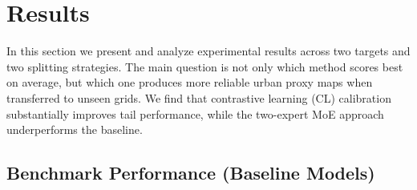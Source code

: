 \documentclass[preprint,12pt]{elsarticle}
\begin{document}
\section{Results}

In this section we present and analyze experimental results across two targets and two splitting strategies. The main question is not only which method scores best on average, but which one produces more reliable urban proxy maps when transferred to unseen grids. We find that contrastive learning (CL) calibration substantially improves tail performance, while the two-expert MoE approach underperforms the baseline.

\subsection{Benchmark Performance (Baseline Models)}
\end{document}
